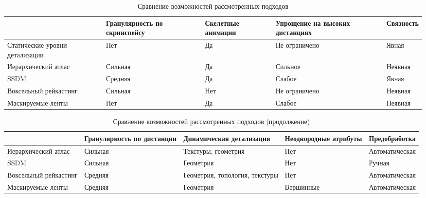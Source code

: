 \begin{table}[ht]
\small
\centering
\begin{tabular}{ p{24mm} | p{26mm} | p{18mm} | p{20mm} | p{16mm} }
                       & Гранулярность по скринспейсу & Скелетные анимации & Упрощение на высоких дистанциях & Связность \\
\hline
Статические уровни детализации & Нет                          & Да                 & Не ограничено            & Явная     \\
\hline
Иерархический атлас    & Сильная                      & Да                 & Сильное                  & Неявная   \\
\hline
SSDM                   & Средняя                      & Да                 & Слабое                   & Явная     \\
\hline
Воксельный рейкастинг  & Сильная                      & Нет                & Не ограничено            & Неявная   \\
\hline
Маскируемые ленты      & Нет                          & Да                 & Слабое                   & Неявная   \\
\end{tabular}
\caption{Сравнение возможностей рассмотренных подходов}
\end{table}

\begin{table}[ht]
\small
\centering
\begin{tabular}{ p{24mm} | p{24mm} | p{24mm} | p{24mm} | p{24mm} }
                      & Гранулярность по дистанции & Динамическая детализация
                      & Неоднородные атрибуты & Предобработка \\
\hline
Иерархический атлас   & Сильная & Текстуры, геометрия            & Нет & Автоматическая \\
\hline
SSDM                  & Сильная & Геометрия                      & Нет & Ручная \\
\hline
Воксельный рейкастинг & Средняя & Геометрия, топология, текстуры & Нет & Автоматическая \\
\hline
Маскируемые ленты     & Средняя & Геометрия                      & Вершинные & Автоматическая \\
\end{tabular}
\caption{Сравнение возможностей рассмотренных подходов (продолжение)}
\end{table}
